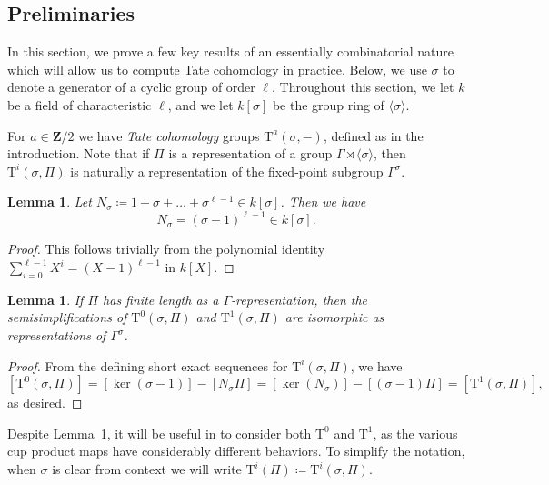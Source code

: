 \documentclass[reqno]{amsart}
\numberwithin{equation}{subsection}
\newcommand{\Z}{\mathbf{Z}}
\newcommand{\tw}[1]{\langle #1 \rangle}
\newcommand{\rT}{\ensuremath{\mathrm{T}}\xspace}
\newtheorem{lemma}[thm]{Lemma}
\theoremstyle{remark}
\numberwithin{equation}{subsection}
\numberwithin{figure}{subsection}
\begin{document}
\subsection{Preliminaries}

In this section, we prove a few key results of an essentially combinatorial nature which will allow us to compute Tate cohomology in practice. Below, we use $\sigma$ to denote a generator of a cyclic group of order $\ell$. Throughout this section, we let $k$ be a field of characteristic $\ell$, and we let $k[\sigma]$ be the group ring of $\langle \sigma \rangle$.

For $a \in \Z/2$ we have \emph{Tate cohomology} groups $\rT^a(\sigma, -)$, defined as in the introduction. Note that if $\Pi$ is a representation of a group $\Gamma \rtimes \tw{\sigma}$, then $\rT^i(\sigma, \Pi)$ is naturally a representation of the fixed-point subgroup $\Gamma^\sigma$. 

\begin{lemma}\label{lem:N_sigma-identity}
Let $N_\sigma \coloneqq 1 + \sigma + \ldots + \sigma^{\ell-1} \in k[\sigma]$. Then we have 
\[
N_\sigma = (\sigma-1)^{\ell-1} \in k[\sigma].
\]
\end{lemma}
\begin{proof}
This follows trivially from the polynomial identity $\sum_{i=0}^{\ell-1} X^i = (X-1)^{\ell-1}$ in $k[X]$.
\end{proof}

\begin{lemma}\label{lem:semisimplifications-Tate-cohomology-coincide} If $\Pi$ has finite length as a $\Gamma$-representation, then the semisimplifications of $\rT^0(\sigma, \Pi)$ and $\rT^1(\sigma, \Pi)$ are isomorphic as representations of $\Gamma^\sigma$.
\end{lemma}


\begin{proof}
From the defining short exact sequences for $\rT^i(\sigma, \Pi)$, we have
\[
[\rT^0(\sigma,\Pi)]=[\ker(\sigma-1)]-[N_\sigma\Pi]=[\ker(N_\sigma)]-[(\sigma-1)\Pi]=[\rT^1(\sigma,\Pi)],
\]
as desired.
\end{proof}

Despite Lemma~\ref{lem:semisimplifications-Tate-cohomology-coincide}, it will be useful in \cite{CF26b} to consider both $\rT^0$ and $\rT^1$, as the various cup product maps have considerably different behaviors. To simplify the notation, when $\sigma$ is clear from context we will write $\rT^i(\Pi) \coloneqq \rT^i(\sigma, \Pi)$.
\end{document}
